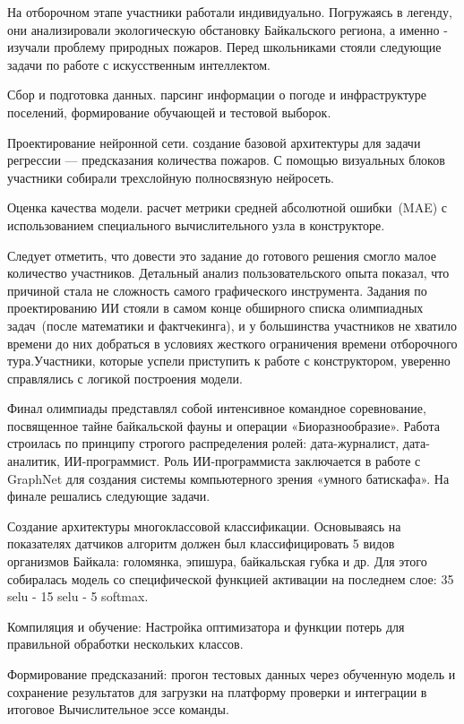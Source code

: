 \documentclass{report}
\begin{document}
На отборочном этапе участники работали индивидуально. Погружаясь в легенду, они анализировали экологическую обстановку Байкальского региона, а именно - изучали проблему природных пожаров. Перед школьниками стояли следующие задачи по работе с искусственным интеллектом.

\begin{enummarker}
\item Сбор и подготовка данных. парсинг информации о погоде и инфраструктуре поселений, формирование обучающей и тестовой выборок.
\item Проектирование нейронной сети. создание базовой архитектуры для задачи регрессии — предсказания количества пожаров. С помощью визуальных блоков участники собирали трехслойную полносвязную нейросеть.
\item Оценка качества модели. расчет метрики средней абсолютной ошибки~(MAE) с использованием специального вычислительного узла в конструкторе.
\end{enummarker}

Следует отметить, что довести это задание до готового решения смогло малое количество участников. Детальный анализ пользовательского опыта показал, что причиной стала не сложность самого графического инструмента. Задания по проектированию ИИ стояли в самом конце обширного списка олимпиадных задач~(после математики и фактчекинга), и у большинства участников  не хватило времени до них добраться в условиях жесткого ограничения времени отборочного тура.Участники, которые успели приступить к работе с конструктором, уверенно справлялись с логикой построения модели.


Финал олимпиады представлял собой интенсивное командное соревнование, посвященное тайне байкальской фауны и операции «Биоразнообразие». Работа строилась по принципу строгого распределения ролей: дата-журналист, дата-аналитик, ИИ-программист. Роль ИИ-программиста заключается в работе с GraphNet для создания системы компьютерного зрения «умного батискафа». На финале решались следующие задачи.

\begin{enummarker}
\item Создание архитектуры многоклассовой классификации. Основываясь на показателях датчиков алгоритм должен был классифицировать 5 видов организмов Байкала: голомянка, эпишура, байкальская губка и др. Для этого собиралась модель со специфической функцией активации на последнем слое: 35 selu - 15 selu - 5 softmax.
\item Компиляция и обучение: Настройка оптимизатора и функции потерь для правильной обработки нескольких классов.
\item Формирование предсказаний: прогон тестовых данных через обученную модель и сохранение результатов для загрузки на платформу проверки и интеграции в итоговое Вычислительное эссе команды.
\end{enummarker}
\end{document}
